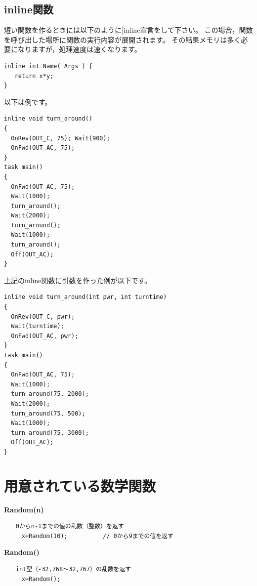 \documentclass[11pt]{jarticle}
\makeatletter
\def\nmindex{\@ifnextchar[{\@nmindex}{\@@nmindex}}
\def\@nmindex[#1]#2{#2\index{#1@#2}}
\def\@@nmindex#1{#1\index{#1}}
\makeatother
\begin{document}
\subsection{inline関数}

短い関数を作るときには以下のように\nmindex{inline}宣言をして下さい。
この場合，関数を呼び出した場所に関数の実行内容が展開されます。
その結果メモリは多く必要になりますが，処理速度は速くなります。

\begin{screen}{\small
\begin{verbatim}
inline int Name( Args ) { 
   return x*y; 
}
\end{verbatim}}
\end{screen}

以下は例です。


\begin{screen}{\small
\begin{verbatim}
inline void turn_around() 
{ 
  OnRev(OUT_C, 75); Wait(900); 
  OnFwd(OUT_AC, 75); 
} 
task main() 
{ 
  OnFwd(OUT_AC, 75); 
  Wait(1000); 
  turn_around(); 
  Wait(2000); 
  turn_around(); 
  Wait(1000); 
  turn_around(); 
  Off(OUT_AC); 
} 
\end{verbatim}}
\end{screen}

上記のinline関数に引数を作った例が以下です。

\begin{screen}{\small
\begin{verbatim}
inline void turn_around(int pwr, int turntime) 
{ 
  OnRev(OUT_C, pwr); 
  Wait(turntime); 
  OnFwd(OUT_AC, pwr); 
} 
task main() 
{ 
  OnFwd(OUT_AC, 75); 
  Wait(1000); 
  turn_around(75, 2000); 
  Wait(2000); 
  turn_around(75, 500); 
  Wait(1000); 
  turn_around(75, 3000); 
  Off(OUT_AC); 
} 
\end{verbatim}}
\end{screen}



\appendix
\section{用意されている数学関数\label{sec:math}}

{\large \textbf{
Random(n)}
}
\begin{verbatim}
　　0からn-1までの値の乱数（整数）を返す
　　　x=Random(10);　　　　　　// 0から9までの値を返す
\end{verbatim}


{\large \textbf{
Random()}
}
\begin{verbatim}
　　int型（-32,768〜32,767）の乱数を返す
　　　x=Random();
\end{verbatim}
\end{document}
